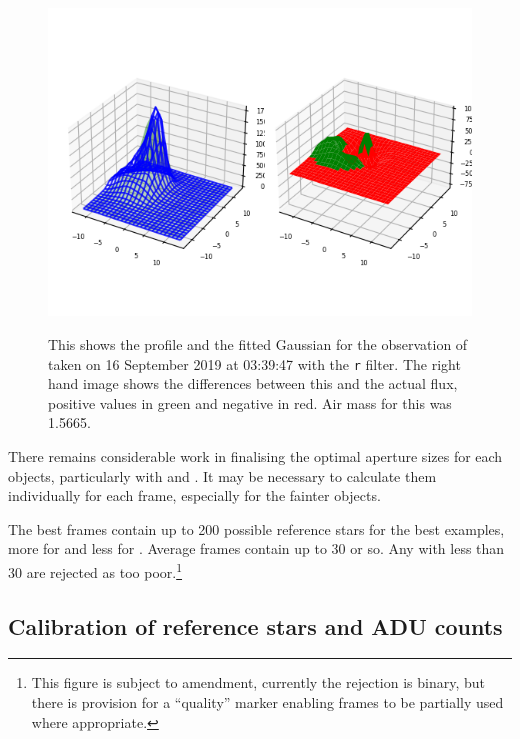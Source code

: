 \begin{figure}[!htbp]
\begin{center}
\includegraphics[scale=0.90]{images/badfit.png} \\
\vspace{-.5cm}
\end{center}
\caption{This shows the profile and the fitted
Gaussian for the observation of {\ross} taken on 16
September 2019 at 03:39:47 with the \texttt{r} filter. The right
hand image shows the differences between this and
the actual flux, positive values in green and
negative in red. Air mass for this was 1.5665.}
\protect\label{fig:badfit}
\end{figure}

There remains considerable work in finalising the optimal aperture sizes for
each objects, particularly with {\prox} and {\bstar}. It may be necessary to
calculate them individually for each frame, especially for the fainter objects.

The best frames contain up to 200 possible reference stars for the best
examples, more for {\prox} and less for {\bstar}. Average frames contain up to
30 or so. Any with less than 30 are rejected as too poor.\footnote{This figure
is subject to amendment, currently the rejection is binary, but there is
provision for a ``quality'' marker enabling frames to be partially used where appropriate.}

\subsection{Calibration of reference stars and ADU counts}
\protect\label{section:calibrationrefstars}

